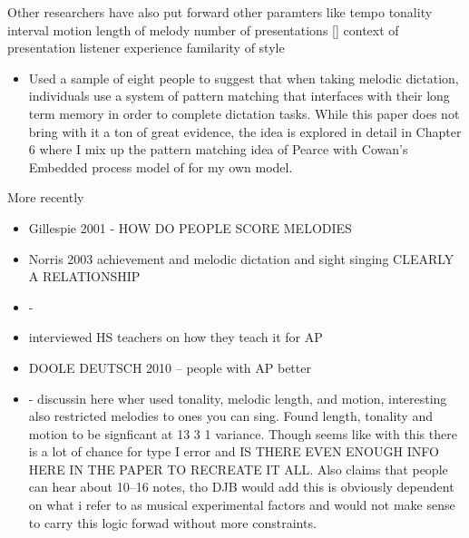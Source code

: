\documentclass[]{book}
\providecommand{\tightlist}{%
  \setlength{\itemsep}{0pt}\setlength{\parskip}{0pt}}
\theoremstyle{definition}
\theoremstyle{definition}
\theoremstyle{definition}
\theoremstyle{remark}
\begin{document}
Other researchers have also put forward other paramters like tempo
\citep{hofstetterComputerBaesedRecognitionPerceptual1981} tonality
\citep{dowlingScaleContourTwo1978}
\citep{longRelationshipsPitchMemory1977}
\citep{pembrookInterferenceTranscriptionProcess1986}
\citep{ouraMemoryMelodiesSubjects1988} interval motion
\citep{ortmannTonalDeterminantsMelodic1933, pembrookInterferenceTranscriptionProcess1986}
length of melody
\citep{longRelationshipsPitchMemory1977, pembrookInterferenceTranscriptionProcess1986}
number of presentations
\citep{hofstetterComputerBaesedRecognitionPerceptual1981}
{[}\citep{pembrookInterferenceTranscriptionProcess1986}{]} context of
presentation \citep{schellenbergEffectTonalRhythmicContext1985} listener
experience
\citep{longRelationshipsPitchMemory1977, ouraMemoryMelodiesSubjects1988}
\citep{schellenbergEffectTonalRhythmicContext1985, taylorStrategiesMemoryShort1983}
familarity of style \citep{schellenbergEffectTonalRhythmicContext1985}

\begin{itemize}
\tightlist
\item
  \citep{ouraConstructingRepresentationMelody1991a} Used a sample of
  eight people to suggest that when taking melodic dictation,
  individuals use a system of pattern matching that interfaces with
  their long term memory in order to complete dictation tasks. While
  this paper does not bring with it a ton of great evidence, the idea is
  explored in detail in Chapter 6 where I mix up the pattern matching
  idea of Pearce with Cowan's Embedded process model of for my own
  model.
\end{itemize}

More recently

\begin{itemize}
\item
  Gillespie 2001 - HOW DO PEOPLE SCORE MELODIES
  \citep{gillespieMelodicDictationScoring2001}
\item
  Norris 2003 achievement and melodic dictation and sight singing
  CLEARLY A RELATIONSHIP \citep{norrisRelationshipSightSinging2003}
\item
  \citep{pembrookSendHelpAural1990} -
\item
  \citep{paneyTeachingMelodicDictation2014} interviewed HS teachers on
  how they teach it for AP
\item
  DOOLE DEUTSCH 2010 -- people with AP better
  \citep{dooleyAbsolutePitchCorrelates2010}
\item
  \citep{pembrookInterferenceTranscriptionProcess1986} - discussin here
  wher used tonality, melodic length, and motion, interesting also
  restricted melodies to ones you can sing. Found length, tonality and
  motion to be signficant at 13 3 1 variance. Though seems like with
  this there is a lot of chance for type I error and IS THERE EVEN
  ENOUGH INFO HERE IN THE PAPER TO RECREATE IT ALL. Also claims that
  people can hear about 10--16 notes, tho DJB would add this is
  obviously dependent on what i refer to as musical experimental factors
  and would not make sense to carry this logic forwad without more
  constraints.
\end{itemize}
\end{document}
